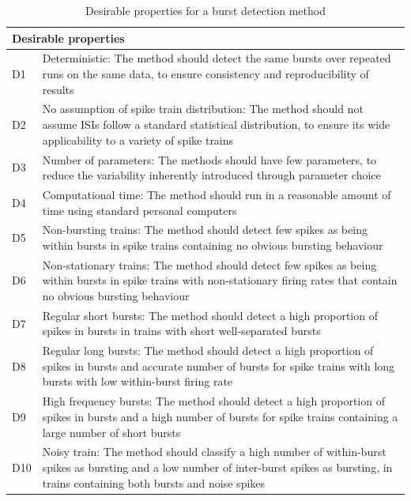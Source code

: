 \documentclass[12pt, titlepage]{article}
\begin{document}
 	\begin{table}[h] \centering 	{}
 		\begin{tabular}{|l|m{13cm}|}
 			\hline \multicolumn{2}{|l|}{Desirable properties}
 			\\ \hline
 			D1 & Deterministic: The method should detect the same bursts over repeated runs on the same  data, to ensure consistency and reproducibility of results
 			\\ D2 & No assumption of spike train distribution: The method should not assume ISIs follow a standard statistical  
 			distribution, to ensure its wide applicability to a variety of spike trains
 			\\  D3 & Number of parameters: The methods should have few parameters, to reduce the variability inherently introduced through parameter choice
 			\\D4 & Computational time: The method should run in a reasonable amount of time using standard personal computers
 			\\ D5 & Non-bursting trains: The method should detect few spikes as being within bursts in spike trains containing no obvious bursting behaviour
 			\\D6 & Non-stationary trains: The method should detect few spikes as being within bursts in spike trains with non-stationary firing rates that contain no obvious bursting behaviour 
 			\\ D7 & Regular short bursts: The method should detect a high proportion of spikes in bursts in trains with short well-separated bursts
 			\\D8 & Regular long bursts: The method should detect a high proportion of spikes in bursts and accurate  number of bursts for spike trains with long bursts with low within-burst firing rate
 			\\  D9 & High frequency bursts: The method should detect a high proportion of spikes in bursts and  a high number of bursts  for spike trains containing a large number of short bursts
 			\\D10 & Noisy train: The method should classify a high number of within-burst spikes as bursting and a low number of inter-burst spikes as bursting, in trains containing both bursts and noise spikes
 			\\ \hline
 		\end{tabular} \caption{Desirable properties for a burst detection method}
 		\label{des_prop}
 	\end{table}
\end{document}
